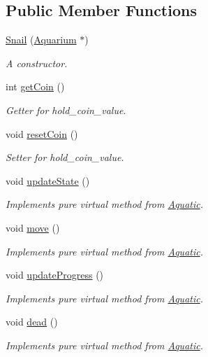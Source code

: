 \subsection*{Public Member Functions}
\begin{DoxyCompactItemize}
\item 
\mbox{\hyperlink{class_snail_af1c67c62983a1278d5a3ac6006de6990}{Snail}} (\mbox{\hyperlink{class_aquarium}{Aquarium}} $\ast$)
\begin{DoxyCompactList}\small\item\em A constructor. \end{DoxyCompactList}\item 
int \mbox{\hyperlink{class_snail_a78405d7cca0e430a3adf51a8461fff68}{get\+Coin}} ()
\begin{DoxyCompactList}\small\item\em Getter for hold\+\_\+coin\+\_\+value. \end{DoxyCompactList}\item 
void \mbox{\hyperlink{class_snail_a21ebc352e8884cd36a1733aafb731944}{reset\+Coin}} ()
\begin{DoxyCompactList}\small\item\em Setter for hold\+\_\+coin\+\_\+value. \end{DoxyCompactList}\item 
void \mbox{\hyperlink{class_snail_a46dbefb10308c29341d96423e853cb2b}{update\+State}} ()
\begin{DoxyCompactList}\small\item\em Implements pure virtual method from \mbox{\hyperlink{class_aquatic}{Aquatic}}. \end{DoxyCompactList}\item 
void \mbox{\hyperlink{class_snail_af5892ec122d9199480c813b74488256b}{move}} ()
\begin{DoxyCompactList}\small\item\em Implements pure virtual method from \mbox{\hyperlink{class_aquatic}{Aquatic}}. \end{DoxyCompactList}\item 
void \mbox{\hyperlink{class_snail_a327c2d31017320c4cd18b48103905fa7}{update\+Progress}} ()
\begin{DoxyCompactList}\small\item\em Implements pure virtual method from \mbox{\hyperlink{class_aquatic}{Aquatic}}. \end{DoxyCompactList}\item 
void \mbox{\hyperlink{class_snail_ae80c3d27739aefd6d9c9078c4d17fcc3}{dead}} ()
\begin{DoxyCompactList}\small\item\em Implements pure virtual method from \mbox{\hyperlink{class_aquatic}{Aquatic}}. \end{DoxyCompactList}\end{DoxyCompactItemize}


